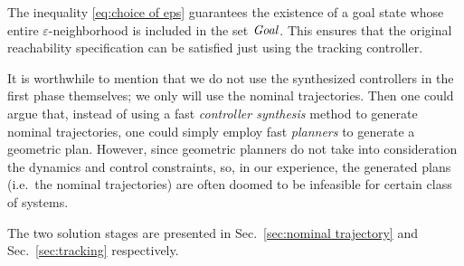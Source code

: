 The inequality \eqref{eq:choice of eps} guarantees the existence of a goal state whose entire $\varepsilon$-neighborhood is included in the set $\mathit{Goal}$.
This ensures that the original reachability specification can be satisfied just using the tracking controller.

It is worthwhile to mention that we do not use the synthesized controllers in the first phase themselves; we only will use the nominal trajectories.
Then one could argue that, instead of using a fast \emph{controller synthesis} method to generate nominal trajectories, one could simply employ fast \emph{planners} \cite{rrt etc.} to generate a geometric plan.
However, since geometric planners do not take into consideration the dynamics and control constraints, so, in our experience, the generated plans (i.e.\ the nominal trajectories) are often doomed to be infeasible for certain class of systems.

The two solution stages are presented in Sec.~\ref{sec:nominal trajectory} and Sec.~\ref{sec:tracking} respectively.








